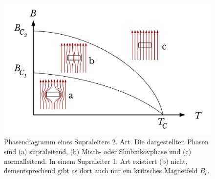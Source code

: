 \begin{figure}[!ht]
    \centering
    \includegraphics[width=\linewidth]{img/Superconductor_type2_phase_diagram.png}
    \caption{Phasendiagramm eines Supraleiters 2. Art.
    Die dargestellten Phasen sind (a) supraleitend, (b) Misch- oder Shubnikovphase und (c) normalleitend.
    In einem Supraleiter 1. Art existiert (b) nicht, dementsprechend gibt es dort auch nur ein kritisches Magnetfeld $B_c$.
    }
    \label{fig:superconductor type 2 phase diagram}
\end{figure}

